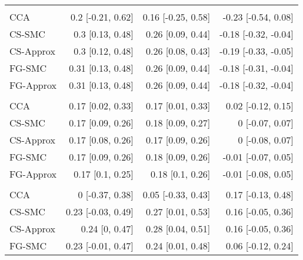 \documentclass[
  12pt,
  a4paper,
]{article}
\begin{document}
\begin{longtable}[t]{lrrr}
\addlinespace[0.3em]
\multicolumn{4}{l}{\textbf{T-cell depletion: yes}}\\
\hspace{1em}CCA & 0.2 [-0.21, 0.62] & 0.16 [-0.25, 0.58] & -0.23 [-0.54, 0.08]\\
\hspace{1em}CS-SMC & 0.3 [0.13, 0.48] & 0.26 [0.09, 0.44] & -0.18 [-0.32, -0.04]\\
\hspace{1em}CS-Approx & 0.3 [0.12, 0.48] & 0.26 [0.08, 0.43] & -0.19 [-0.33, -0.05]\\
\hspace{1em}FG-SMC & 0.31 [0.13, 0.48] & 0.26 [0.09, 0.44] & -0.18 [-0.31, -0.04]\\
\hspace{1em}FG-Approx & 0.31 [0.13, 0.48] & 0.26 [0.09, 0.44] & -0.18 [-0.32, -0.04]\\
\addlinespace[0.3em]
\multicolumn{4}{l}{\textbf{WBC count (log)}}\\
\hspace{1em}CCA & 0.17 [0.02, 0.33] & 0.17 [0.01, 0.33] & 0.02 [-0.12, 0.15]\\
\hspace{1em}CS-SMC & 0.17 [0.09, 0.26] & 0.18 [0.09, 0.27] & 0 [-0.07, 0.07]\\
\hspace{1em}CS-Approx & 0.17 [0.08, 0.26] & 0.17 [0.09, 0.26] & 0 [-0.08, 0.07]\\
\hspace{1em}FG-SMC & 0.17 [0.09, 0.26] & 0.18 [0.09, 0.26] & -0.01 [-0.07, 0.05]\\
\hspace{1em}FG-Approx & 0.17 [0.1, 0.25] & 0.18 [0.1, 0.26] & -0.01 [-0.08, 0.05]\\
\addlinespace[0.3em]
\multicolumn{4}{l}{\textbf{Weight loss: yes}}\\
\hspace{1em}CCA & 0 [-0.37, 0.38] & 0.05 [-0.33, 0.43] & 0.17 [-0.13, 0.48]\\
\hspace{1em}CS-SMC & 0.23 [-0.03, 0.49] & 0.27 [0.01, 0.53] & 0.16 [-0.05, 0.36]\\
\hspace{1em}CS-Approx & 0.24 [0, 0.47] & 0.28 [0.04, 0.51] & 0.16 [-0.05, 0.36]\\
\hspace{1em}FG-SMC & 0.23 [-0.01, 0.47] & 0.24 [0.01, 0.48] & 0.06 [-0.12, 0.24]\\

\end{longtable}
\end{document}
